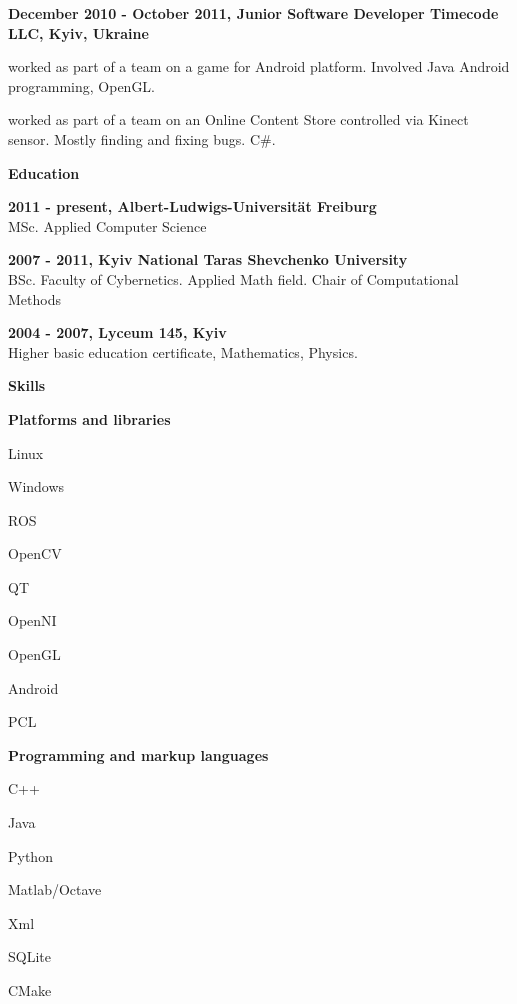 \documentclass[a4paper,12pt,final]{memoir}
\newcommand{\Sep}{\vspace{1.5em}}
\newcommand{\SmallSep}{\vspace{0.5em}}
\newcommand{\CVSection}[1]
	{\Large\textbf{#1}\par
	\SmallSep\normalsize\normalfont}
\newcommand{\CVItem}[1]
	{\textbf{\color{MidnightBlue} #1}}
\begin{document}
\CVItem{December 2010 - October 2011, Junior Software Developer
\newline Timecode LLC, Kyiv, Ukraine}
\begin{compactitem}[\color{MidnightBlue}$\circ$]
\item worked as part of a team on a game for Android platform. Involved Java Android programming, OpenGL.
\item worked as part of a team on an Online Content Store controlled via Kinect sensor. Mostly finding and fixing bugs. C\#.
\end{compactitem}
\Sep

\CVSection{Education}
\CVItem{2011 - present, Albert-Ludwigs-Universität Freiburg}\\
MSc. Applied Computer Science
\SmallSep

\CVItem{2007 - 2011, Kyiv National Taras Shevchenko University}\\
BSc. Faculty of Cybernetics. Applied Math field. 
\newline Chair of Computational Methods
\SmallSep

\CVItem{2004 - 2007, Lyceum 145, Kyiv}\\
Higher basic education certificate, Mathematics, Physics.
\Sep
\framebreak
\clearpage
\framebreak
\framebreak

\CVSection{Skills}
\CVItem{Platforms and libraries}
\begin{multicols}{3}
\begin{compactitem}[\color{MidnightBlue}$\circ$]
	\item Linux
	\item Windows
	\item ROS 
	\item OpenCV
	\item QT
	\item OpenNI 
	\item OpenGL
	\item Android
	\item PCL
\end{compactitem}
\end{multicols}
\SmallSep

\CVItem{Programming and markup languages}
\begin{multicols}{3}
\begin{compactitem}[\color{MidnightBlue}$\circ$]
	\item C++ 
	\item Java 
	\item Python 
	\item Matlab/Octave 
	\item Xml
	\item SQLite
	\item CMake
\end{compactitem}
\end{multicols}
\SmallSep
\end{document}
